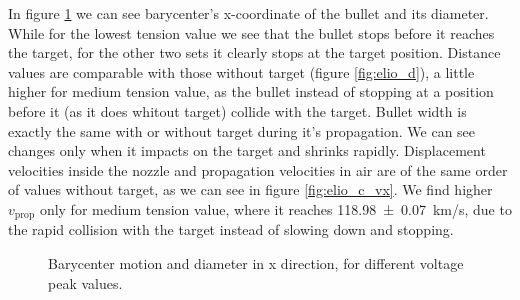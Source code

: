 In figure \ref{fig:elio_c_xb} we can see barycenter's x-coordinate of the bullet and its diameter. While for the lowest tension value we see that the bullet stops before it reaches the target, for the other two sets it clearly stops at the target position. Distance values are comparable with those without target (figure \ref{fig:elio_d}), a little higher for medium tension value, as the bullet instead of stopping at a position before it (as it does whitout target) collide with the target.
Bullet width is exactly the same with or without target during it's propagation. We can see changes only when it impacts on the target and shrinks rapidly.
Displacement velocities inside the nozzle and propagation velocities in air are of the same order of values without target, as we can see in figure \ref{fig:elio_c_vx}. We find higher $v_{\text{prop}}$ only for medium tension value, where it reaches \SI{118.98(7)}{\kilo\meter/\second}, due to the rapid collision with the target instead of slowing down and stopping.
\begin{figure}
 \centering
 \hfill
 \caption{Barycenter motion and diameter in x direction, for different voltage peak values.}
 \label{fig:elio_c_xb}
 \end{figure}

